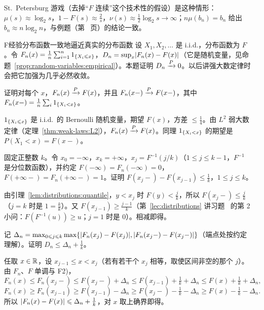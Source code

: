 \begin{probleme}
\begin{questions}
\begin{solution}
St.\ Petersburg 游戏（去掉“$F$ 连续”这个技术性的假设）是这种情形：$\mu(s)\approx\log_2s$，$1-F(s)\approx\frac2s$，$\nu(s)\approx\frac12\log_2s\to\infty$；$n\mu(b_n)=b_n$ 给出 $b_n\approx n\log_2n$，与例题（第~\pageref{we:weak-laws:st-petersburg} 页）的结论一致。
\end{solution}
\end{questions}
\end{probleme}


\begin{probleme}{F}{经验分布函数一致地逼近真实的分布函数}
设 $X_1,X_2,\dots$ 是 i.i.d.，分布函数为 $F$。令 $F_n(x)=\frac1n\sum_{i=1}^n1_{\{X_i\leqslant x\}}$，$D_n=\sup_x\lvert F_n(x)-F(x)\rvert$（它是随机变量，见命题~\ref{prop:random-variables:empirical}）。本题证明 $D_n\xrightarrow{P}0$。以后讲强大数定律时会把它加强为几乎必然收敛。
\begin{questions}
\item 证明对每个 $x$，$F_n(x)\xrightarrow{P} F(x)$，并且 $F_n(x-)\xrightarrow{P} F(x-)$，其中 $F_n(x-)=\frac1n\sum_i1_{\{X_i<x\}}$。
\begin{solution}
$1_{\{X_i\leqslant x\}}$ 是 i.i.d.\ 的 Bernoulli 随机变量，期望 $F(x)$，方差 $\leqslant\frac14$。由 $L^2$ 弱大数定律（定理~\ref{thm:weak-laws:L2}），$F_n(x)\xrightarrow{P} F(x)$。同理 $1_{\{X_i<x\}}$ 的期望是 $P(X_1<x)=F(x-)$。
\end{solution}
\item 固定正整数 $k$。令 $x_0=-\infty$，$x_k=+\infty$，$x_j=F^{-1}(j/k)$（$1\leqslant j\leqslant k-1$，$F^{-1}$ 是分位数函数），并约定 $F(-\infty)=F_n(-\infty)=0$，$F(+\infty-)=F_n(+\infty-)=1$。证明 $F(x_j-)-F(x_{j-1})\leqslant\frac1k$，$1\leqslant j\leqslant k$。
\begin{solution}
由引理~\ref{lem:distributions:quantile}，$y<x_j$ 时 $F(y)<\frac jk$，所以 $F(x_j-)\leqslant\frac jk$（$j=k$ 时是 $1=\frac kk$）。又 $F(x_{j-1})\geqslant\frac{j-1}k$（第~\ref{lec:distributions} 讲习题~ 的第 2 小问：$F(F^{-1}(u))\geqslant u$；$j=1$ 时是 $0$）。相减即得。
\end{solution}
\item 记 $\Delta_n=\max_{0\leqslant j\leqslant k}\max\{\lvert F_n(x_j)-F(x_j)\rvert,\lvert F_n(x_j-)-F(x_j-)\rvert\}$（端点处按约定理解）。证明 $D_n\leqslant\Delta_n+\frac1k$。
\begin{solution}
任取 $x\in\mathbb{R}$，设 $x_{j-1}\leqslant x<x_j$（若有若干个 $x_j$ 相等，取使区间非空的那个 $j$）。由 $F_n$、$F$ 单调与 F2)，
\[
F_n(x)\leqslant F_n(x_j-)\leqslant F(x_j-)+\Delta_n\leqslant F(x_{j-1})+\tfrac1k+\Delta_n\leqslant F(x)+\tfrac1k+\Delta_n,
\]
\[
F_n(x)\geqslant F_n(x_{j-1})\geqslant F(x_{j-1})-\Delta_n\geqslant F(x_j-)-\tfrac1k-\Delta_n\geqslant F(x)-\tfrac1k-\Delta_n .
\]
所以 $\lvert F_n(x)-F(x)\rvert\leqslant\Delta_n+\frac1k$，对 $x$ 取上确界即得。


\end{solution}
\end{questions}
\end{probleme}
